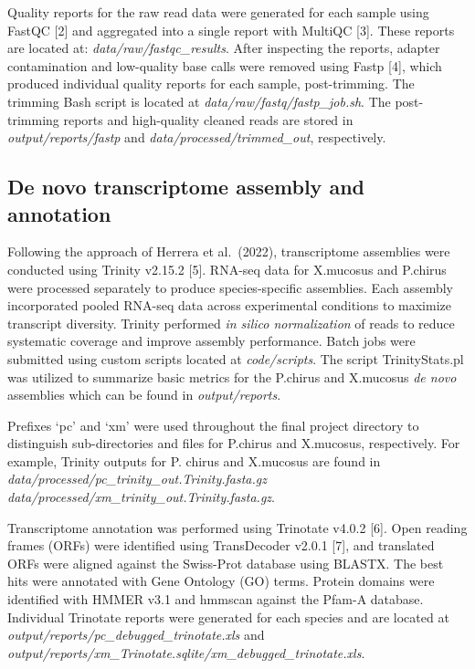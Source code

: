 \documentclass[12pt,]{article}
\begin{document}
Quality reports for the raw read data were generated for each sample
using FastQC {[}2{]} and aggregated into a single report with MultiQC
{[}3{]}. These reports are located at: \emph{data/raw/fastqc\_results}.
After inspecting the reports, adapter contamination and low-quality base
calls were removed using Fastp {[}4{]}, which produced individual
quality reports for each sample, post-trimming. The trimming Bash script
is located at \emph{data/raw/fastq/fastp\_job.sh}. The post-trimming
reports and high-quality cleaned reads are stored in
\emph{output/reports/fastp} and \emph{data/processed/trimmed\_out},
respectively.

\subsection{De novo transcriptome assembly and
annotation}\label{de-novo-transcriptome-assembly-and-annotation}

Following the approach of Herrera et al.~(2022), transcriptome
assemblies were conducted using Trinity v2.15.2 {[}5{]}. RNA-seq data
for X.mucosus and P.chirus were processed separately to produce
species-specific assemblies. Each assembly incorporated pooled RNA-seq
data across experimental conditions to maximize transcript diversity.
Trinity performed \emph{in silico normalization} of reads to reduce
systematic coverage and improve assembly performance. Batch jobs were
submitted using custom scripts located at \emph{code/scripts}. The
script TrinityStats.pl was utilized to summarize basic metrics for the
P.chirus and X.mucosus \emph{de novo} assemblies which can be found in
\emph{output/reports}.

Prefixes `pc' and `xm' were used throughout the final project directory
to distinguish sub-directories and files for P.chirus and X.mucosus,
respectively. For example, Trinity outputs for P. chirus and X.mucosus
are found in \emph{data/processed/pc\_trinity\_out.Trinity.fasta.gz}
\emph{data/processed/xm\_trinity\_out.Trinity.fasta.gz}.

Transcriptome annotation was performed using Trinotate v4.0.2 {[}6{]}.
Open reading frames (ORFs) were identified using TransDecoder v2.0.1
{[}7{]}, and translated ORFs were aligned against the Swiss-Prot
database using BLASTX. The best hits were annotated with Gene Ontology
(GO) terms. Protein domains were identified with HMMER v3.1 and hmmscan
against the Pfam-A database. Individual Trinotate reports were generated
for each species and are located at
\emph{output/reports/pc\_debugged\_trinotate.xls} and
\emph{output/reports/xm\_Trinotate.sqlite/xm\_debugged\_trinotate.xls}.
\end{document}
